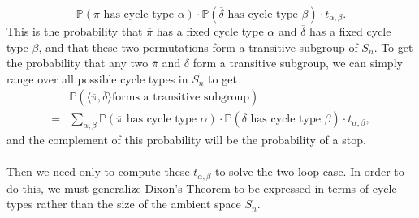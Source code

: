 \[
  \mathbb{P}(\overline\pi\text{ has cycle type
  }\alpha)\cdot\mathbb{P}(\overline\delta\text{ has cycle type
  }\beta)\cdot t_{\alpha, \beta}.
\]
This is the probability that $\overline\pi$ has a fixed cycle type
$\alpha$ and $\overline\delta$ has a fixed cycle type $\beta$, and
that these two permutations form a transitive subgroup of $S_n$. To get the
probability that any two $\overline\pi$ and $\overline\delta$ form a
transitive subgroup, we can simply range over all possible cycle
types in $S_n$ to get
\begin{align*}
  & \mathbb{P}(\langle \overline\pi,\overline\delta \rangle\text{
  forms a transitive subgroup})
  \\= &\sum_{\alpha, \beta}\mathbb{P}(\overline\pi\text{ has cycle
  type }\alpha)\cdot\mathbb{P}(\overline\delta\text{ has cycle type
  }\beta)\cdot t_{\alpha, \beta},
\end{align*}
and the complement of this probability will be the probability of a stop.
\\\\Then we need only to compute these $t_{\alpha, \beta}$ to solve
the two loop case. In order to do this, we must generalize Dixon's
Theorem to be expressed in terms of cycle types rather than the size
of the ambient space $S_n$.
